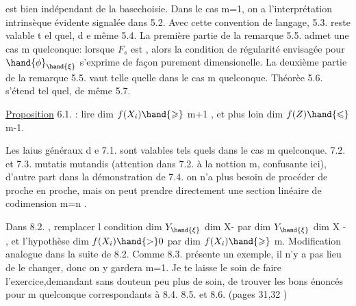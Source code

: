 
est bien indépendant de la base\hand{/}choisie.  Dans le cas  m=1, on a
l'interprétation intrinsèque évidente signalée dans 5.2.  Avec cette
convention de langage, 5.3.  reste valable t el quel, d e même 5.4.
La première partie de la remarque 5.5.   admet une  
 cas m quelconque:  lorsque $F_s$  est  , alors la condition de
régularité envisagée pour $\hand{\phi}_{\hand{\xi}}$  s'exprime de façon purement dimensionelle.
La deuxième partie de la remarque 5.5. vaut telle quelle dans le cas
m quelconque.      Théorèe 5.6.  s'étend tel quel,  de même 5.7.

\uline{Proposition} 6.1.  :  lire   dim $f(X_i) \hand{\geqslant}$  m+1 ,  et
plus loin   dim $f(Z) \hand{\leqslant}$ m-1.

Les laius généraux d e 7.1. sont valables tels quels dans le cas
m quelconque.  7.2. et 7.3.  mutatis mutandis (attention dans 7.2.
à la nottion m, confusante ici),  d'autre part dans la démonstration
de 7.4. on n'a plus besoin de procéder de proche en proche, mais on
peut prendre directement une section linéaire  de codimension m=n .

Dans 8.2. , remplacer l condition    dim $Y_{\hand{\xi}}$ \hand{$>$} dim X-
par  dim $Y_{\hand{\xi}}$ \hand{$>$}  dim X  -  , et l'hypothèse  dim $f(X_i) \hand{>} 0$  par
dim $f(X_i) \hand{\geqslant}$ m.   Modification analogue dans la suite de 8.2.  Comme
8.3.  présente un exemple, il n'y a pas lieu de le changer, donc on
y gardera m=1.   Je te laisse le soin de faire l'exercice,demandant
sans doute\hand{/}un peu plus de soin, de trouver  les bons énoncés pour m
quelconque correspondants à  8.4.  8.5.  et 8.6.   (pages 31,32 )\hand{;}

